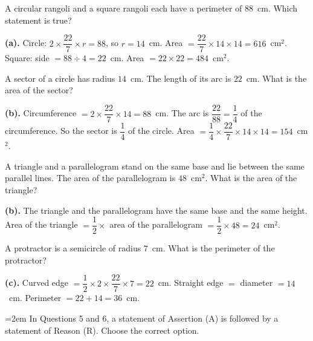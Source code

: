 \ques A circular rangoli and a square rangoli each have a perimeter of $88$~cm. Which statement is true?\par
{}
\begin{answerblock}
\textbf{(a).}\nl
Circle: $2\times\dfrac{22}{7}\times r=88$, so $r=14$~cm. Area $=\dfrac{22}{7}\times14\times14=616$~cm$^2$.\nl
Square: side $=88\div4=22$~cm. Area $=22\times22=484$~cm$^2$.
\end{answerblock}

\ques A sector of a circle has radius $14$~cm. The length of its arc is $22$~cm. What is the area of the sector?\par
{}
\begin{answerblock}
\textbf{(b).}\nl
Circumference $=2\times\dfrac{22}{7}\times14=88$~cm. The arc is $\dfrac{22}{88}=\dfrac14$ of the circumference.\nl
So the sector is $\dfrac14$ of the circle. Area $=\dfrac14\times\dfrac{22}{7}\times14\times14=154$~cm$^2$.
\end{answerblock}

\ques A triangle and a parallelogram stand on the same base and lie between the same parallel lines. The area of the parallelogram is $48$~cm$^2$. What is the area of the triangle?\par
{}
\begin{answerblock}
\textbf{(b).}\nl
The triangle and the parallelogram have the same base and the same height.\nl
Area of the triangle $=\dfrac12\times$ area of the parallelogram $=\dfrac12\times48=24$~cm$^2$.
\end{answerblock}

\ques A protractor is a semicircle of radius $7$~cm. What is the perimeter of the protractor?\par
{}
\begin{answerblock}
\textbf{(c).}\nl
Curved edge $=\dfrac12\times2\times\dfrac{22}{7}\times7=22$~cm. Straight edge $=$ diameter $=14$~cm.\nl
Perimeter $=22+14=36$~cm.
\end{answerblock}

\par\medskip\noindent\hangindent=2em In Questions 5 and 6, a statement of Assertion (A) is followed by a statement of Reason (R). Choose the correct option.
\par\smallskip

